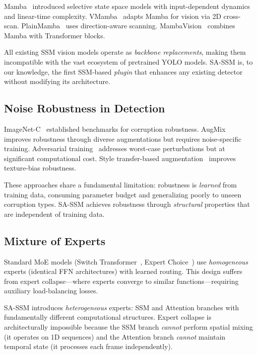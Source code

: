 \documentclass[conference]{IEEEtran}
\begin{document}
Mamba~\cite{gu2023mamba} introduced selective state space models with input-dependent dynamics and linear-time complexity. VMamba~\cite{liu2024vmamba} adapts Mamba for vision via 2D cross-scan. PlainMamba~\cite{yang2024plainmamba} uses direction-aware scanning. MambaVision~\cite{hatamizadeh2024mambavision} combines Mamba with Transformer blocks.

All existing SSM vision models operate as \emph{backbone replacements}, making them incompatible with the vast ecosystem of pretrained YOLO models. SA-SSM is, to our knowledge, the first SSM-based \emph{plugin} that enhances any existing detector without modifying its architecture.

\subsection{Noise Robustness in Detection}

ImageNet-C~\cite{hendrycks2019benchmarking} established benchmarks for corruption robustness. AugMix~\cite{hendrycks2020augmix} improves robustness through diverse augmentations but requires noise-specific training. Adversarial training~\cite{madry2018towards} addresses worst-case perturbations but at significant computational cost. Style transfer-based augmentation~\cite{geirhos2019imagenet} improves texture-bias robustness.

These approaches share a fundamental limitation: robustness is \emph{learned} from training data, consuming parameter budget and generalizing poorly to unseen corruption types. SA-SSM achieves robustness through \emph{structural} properties that are independent of training data.

\subsection{Mixture of Experts}

Standard MoE models (Switch Transformer~\cite{fedus2022switch}, Expert Choice~\cite{zhou2022mixture}) use \emph{homogeneous} experts (identical FFN architectures) with learned routing. This design suffers from expert collapse---where experts converge to similar functions---requiring auxiliary load-balancing losses.

SA-SSM introduces \emph{heterogeneous} experts: SSM and Attention branches with fundamentally different computational structures. Expert collapse is architecturally impossible because the SSM branch \emph{cannot} perform spatial mixing (it operates on 1D sequences) and the Attention branch \emph{cannot} maintain temporal state (it processes each frame independently).
\end{document}
